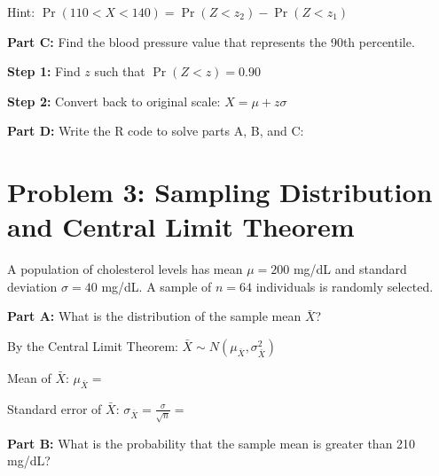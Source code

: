 \documentclass[11pt]{article}
\begin{document}
Hint: $\Pr(110 < X < 140) = \Pr(Z < z_2) - \Pr(Z < z_1)$

\vspace{3.5cm}

\textbf{Part C:} Find the blood pressure value that represents the 90th percentile.

\vspace{0.3cm}

\textbf{Step 1:} Find $z$ such that $\Pr(Z < z) = 0.90$

\vspace{1.5cm}

\textbf{Step 2:} Convert back to original scale: $X = \mu + z\sigma$

\vspace{2cm}

\textbf{Part D:} Write the R code to solve parts A, B, and C:

\vspace{2.5cm}

\newpage

\section{Problem 3: Sampling Distribution and Central Limit Theorem}

A population of cholesterol levels has mean $\mu = 200$ mg/dL and standard deviation $\sigma = 40$ mg/dL. A sample of $n = 64$ individuals is randomly selected.

\vspace{6pt}

\textbf{Part A:} What is the distribution of the sample mean $\bar{X}$?

\vspace{0.3cm}

By the Central Limit Theorem: $\bar{X} \sim N(\mu_{\bar{X}}, \sigma_{\bar{X}}^2)$

\vspace{0.3cm}

Mean of $\bar{X}$: $\mu_{\bar{X}} = $

\vspace{1cm}

Standard error of $\bar{X}$: $\sigma_{\bar{X}} = \frac{\sigma}{\sqrt{n}} = $

\vspace{1.5cm}

\textbf{Part B:} What is the probability that the sample mean is greater than 210 mg/dL?

\vspace{0.3cm}
\end{document}
